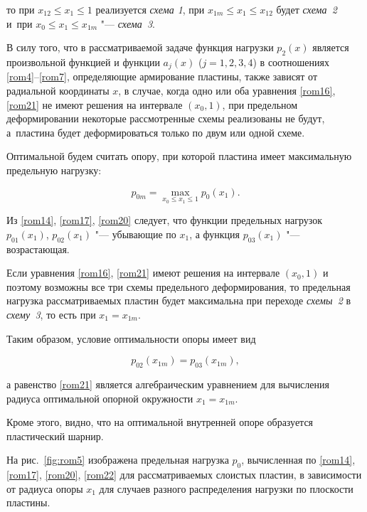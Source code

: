 то при $x_{12}\le x_1\le1$ реализуется {\sl схема 1}, при $x_{1m}\le x_1\le x_{12}$ будет {\sl схема~2} и~при $x_0\le x_1\le x_{1m}$ "--- {\sl схема~3}.

В силу того, что в рассматриваемой задаче функция нагрузки $p_2(x)$ является произвольной функцией и функции $a_j(x)$ (${j=1, 2, 3, 4}$) в соотношениях \eqref{rom4}--\eqref{rom7}, определяющие армирование пластины, также зависят от радиальной координаты $x$, в случае, когда одно или оба уравнения \eqref{rom16}, \eqref{rom21} не имеют решения на интервале $(x_0 , 1)$, при предельном деформировании некоторые рассмотренные схемы реализованы не будут, а~пластина будет деформироваться только по двум или одной схеме.



\smallskip




Оптимальной будем считать опору, при которой пластина имеет максимальную предельную нагрузку:

$$

p_{0m}=\max\limits_{x_0\le x_1\le1} p_0(x_1).

$$



Из \eqref{rom14}, \eqref{rom17}, \eqref{rom20} следует, что функции предельных нагрузок $p_{01}(x_1)$, $p_{02}(x_1)$ "--- убывающие по $x_1$, а функция $p_{03}(x_1)$ "--- возрастающая.

Если уравнения \eqref{rom16}, \eqref{rom21} имеют решения на интервале $(x_0, 1)$ и поэтому возможны все три схемы предельного деформирования, то предельная нагрузка рассматриваемых пластин будет максимальна при переходе {\sl схемы~2} в {\sl схему~3}, то есть при $x_1=x_{1m}$.

Таким образом, условие оптимальности опоры имеет вид

$$p_{02}(x_{1m})=p_{03}(x_{1m}),$$

а равенство \eqref{rom21} является алгебраическим уравнением для вычисления радиуса оптимальной опорной окружности $x_1=x_{1m}$.

Кроме этого, видно, что на оптимальной внутренней опоре образуется пластический шарнир.



На рис.~\ref{fig:rom5}  изображена предельная нагрузка $p_0$, вычисленная по \eqref{rom14}, \eqref{rom17}, \eqref{rom20}, \eqref{rom22} для рассматриваемых слоистых пластин, в зависимости от радиуса опоры $x_1$ для случаев разного распределения нагрузки по плоскости пластины.

